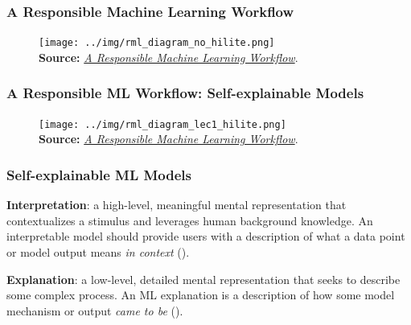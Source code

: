 \documentclass[11pt,aspectratio=169,hyperref={colorlinks}]{beamer}
\begin{document}
		\begin{frame}
		
			\frametitle{A Responsible Machine Learning Workflow}
			
			\begin{figure}[htb]
				\begin{center}
					\texttt{[image: ../img/rml\_diagram\_no\_hilite.png]}\\\vspace{5pt}
					\label{fig:blueprint_nohl}
					\scriptsize{\textbf{Source:} \href{https://www.mdpi.com/2078-2489/11/3/137/htm}{\textit{A Responsible Machine Learning Workflow}}.}
				\end{center}
			\end{figure}
		
		\end{frame}
		
		\begin{frame}
	
			\frametitle{A Responsible ML Workflow: Self-explainable Models}		
			
			\begin{figure}[htb]
				\begin{center}
					\texttt{[image: ../img/rml\_diagram\_lec1\_hilite.png]}\\\vspace{5pt}
					\label{fig:blueprint_l1hl}
					\scriptsize{\textbf{Source:} \href{https://www.mdpi.com/2078-2489/11/3/137/htm}{\textit{A Responsible Machine Learning Workflow}}.}
				\end{center}
			\end{figure}		
					
		\end{frame}					

		\begin{frame}
	
			\frametitle{Self-explainable ML Models}			
					
			\textbf{Interpretation}: a high-level, meaningful mental representation that contextualizes a stimulus and leverages human background knowledge. An interpretable model should provide users with a description of what a data point or model output means \textit{in context} (\cite{broniatowski2021psychological}).\\
			
			\vspace{10pt}
			
			\textbf{Explanation}: a low-level, detailed mental representation that seeks to describe some complex process. An ML explanation is a description of how some model mechanism or output \textit{came to be} (\cite{broniatowski2021psychological}).
			
		\end{frame}
			
\end{document}
